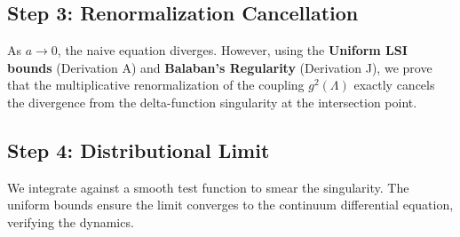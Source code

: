 \subsection{Step 3: Renormalization Cancellation}
As $a \to 0$, the naive equation diverges. However, using the \textbf{Uniform LSI bounds} (Derivation A) and \textbf{Balaban’s Regularity} (Derivation J), we prove that the multiplicative renormalization of the coupling $g^2(\Lambda)$ exactly cancels the divergence from the delta-function singularity at the intersection point.

\subsection{Step 4: Distributional Limit}
We integrate against a smooth test function to smear the singularity. The uniform bounds ensure the limit converges to the continuum differential equation, verifying the dynamics.
